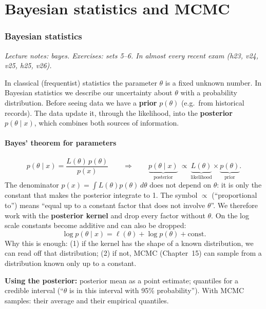 \part{Bayesian statistics and MCMC}

\section{Bayesian statistics}
\textit{Lecture notes: bayes. Exercises: sets 5--6. In almost every recent exam (h23, v24, v25, h25, v26).}

\begin{idea}
In classical (frequentist) statistics the parameter $\theta$ is a fixed unknown number. In Bayesian statistics we describe our uncertainty about $\theta$ with a probability distribution. Before seeing data we have a \textbf{prior} $p(\theta)$ (e.g.\ from historical records). The data update it, through the likelihood, into the \textbf{posterior} $p(\theta\mid x)$, which combines both sources of information.
\end{idea}

\subsection{Bayes' theorem for parameters}
\[
p(\theta\mid x) = \frac{L(\theta)\,p(\theta)}{p(x)} \qquad\Longrightarrow\qquad
\underbrace{p(\theta\mid x)}_{\text{posterior}}\ \propto\ \underbrace{L(\theta)}_{\text{likelihood}}\times\underbrace{p(\theta)}_{\text{prior}}.
\]
The denominator $p(x) = \int L(\theta)p(\theta)\,d\theta$ does not depend on $\theta$: it is only the constant that makes the posterior integrate to 1. The symbol $\propto$ (``proportional to'') means ``equal up to a constant factor that does not involve $\theta$''. We therefore work with the \textbf{posterior kernel} and drop every factor without $\theta$. On the log scale constants become additive and can also be dropped:
\[
\log p(\theta\mid x) = \ell(\theta) + \log p(\theta) + \text{const}.
\]
Why this is enough: (1) if the kernel has the shape of a known distribution, we can read off that distribution; (2) if not, MCMC (Chapter~15) can sample from a distribution known only up to a constant.

\textbf{Using the posterior:} posterior mean as a point estimate; quantiles for a credible interval (``$\theta$ is in this interval with 95\% probability''). With MCMC samples: their average and their empirical quantiles.

